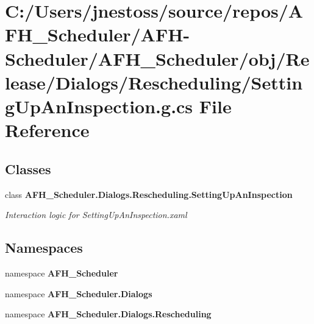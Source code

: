 \section{C\+:/\+Users/jnestoss/source/repos/\+A\+F\+H\+\_\+\+Scheduler/\+A\+F\+H-\/\+Scheduler/\+A\+F\+H\+\_\+\+Scheduler/obj/\+Release/\+Dialogs/\+Rescheduling/\+Setting\+Up\+An\+Inspection.g.\+cs File Reference}
\label{_release_2_dialogs_2_rescheduling_2_setting_up_an_inspection_8g_8cs}
\subsection*{Classes}
\begin{DoxyCompactItemize}
\item 
class \textbf{ A\+F\+H\+\_\+\+Scheduler.\+Dialogs.\+Rescheduling.\+Setting\+Up\+An\+Inspection}
\begin{DoxyCompactList}\small\item\em Interaction logic for Setting\+Up\+An\+Inspection.\+xaml \end{DoxyCompactList}\end{DoxyCompactItemize}
\subsection*{Namespaces}
\begin{DoxyCompactItemize}
\item 
namespace \textbf{ A\+F\+H\+\_\+\+Scheduler}
\item 
namespace \textbf{ A\+F\+H\+\_\+\+Scheduler.\+Dialogs}
\item 
namespace \textbf{ A\+F\+H\+\_\+\+Scheduler.\+Dialogs.\+Rescheduling}
\end{DoxyCompactItemize}
